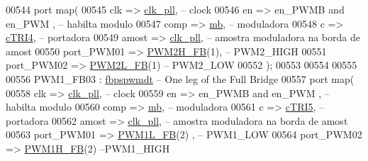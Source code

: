 \begin{DoxyCode}
00544     \textcolor{keywordflow}{port} \textcolor{keywordflow}{map}( 
00545          clk => \hyperlink{class_d_e0___n_a_n_o___v_f_1_1_m_a_i_n_a1d63ebfc050c1099e1dff991817ec3b0}{clk\_pll},\textcolor{keyword}{ -- clock}
00546          en => en\_PWMB \textcolor{keywordflow}{and} en\_PWM  ,\textcolor{keyword}{ -- habilta modulo}
00547          comp  => \hyperlink{class_d_e0___n_a_n_o___v_f_1_1_m_a_i_n_ad0814aaad64ee4aa4283f091e1cc4dfc}{mb},\textcolor{keyword}{ -- moduladora     }
00548          c => \hyperlink{class_d_e0___n_a_n_o___v_f_1_1_m_a_i_n_a569a3e9bfb8853bdf2c985d444cb4863}{cTRI4},\textcolor{keyword}{ -- portadora}
00549          amost => \hyperlink{class_d_e0___n_a_n_o___v_f_1_1_m_a_i_n_a1d63ebfc050c1099e1dff991817ec3b0}{clk\_pll},\textcolor{keyword}{ -- amostra moduladora na borda de amost}
00550          port\_PWM01  => \hyperlink{class_d_e0___n_a_n_o___v_f_a7efac822a270a6c828ef5eb2cc090127}{PWM2H\_FB}\textcolor{vhdlchar}{(}\textcolor{vhdllogic}{1}\textcolor{vhdlchar}{)},\textcolor{keyword}{ -- PWM2\_HIGH}
00551          port\_PWM02 => \hyperlink{class_d_e0___n_a_n_o___v_f_aefa13a97661cae3b7b87245ed460abe5}{PWM2L\_FB}\textcolor{vhdlchar}{(}\textcolor{vhdllogic}{1}\textcolor{vhdlchar}{)}\textcolor{keyword}{   -- PWM2\_LOW}
00552          \textcolor{vhdlchar}{)};                  
00553          
00554          
00555 
00556 PWM1\_FB03 : \hyperlink{classfbpspwmdt}{fbpspwmdt} -- One leg \textcolor{keywordflow}{of} the Full Bridge
00557     \textcolor{keywordflow}{port} \textcolor{keywordflow}{map}( 
00558          clk => \hyperlink{class_d_e0___n_a_n_o___v_f_1_1_m_a_i_n_a1d63ebfc050c1099e1dff991817ec3b0}{clk\_pll},\textcolor{keyword}{ -- clock}
00559          en => en\_PWMB \textcolor{keywordflow}{and} en\_PWM  ,\textcolor{keyword}{ -- habilta modulo}
00560          comp  => \hyperlink{class_d_e0___n_a_n_o___v_f_1_1_m_a_i_n_ad0814aaad64ee4aa4283f091e1cc4dfc}{mb},\textcolor{keyword}{ -- moduladora     }
00561          c => \hyperlink{class_d_e0___n_a_n_o___v_f_1_1_m_a_i_n_abc70ad694fb9be4565a31c4cde31d225}{cTRI5},\textcolor{keyword}{ -- portadora}
00562          amost => \hyperlink{class_d_e0___n_a_n_o___v_f_1_1_m_a_i_n_a1d63ebfc050c1099e1dff991817ec3b0}{clk\_pll},\textcolor{keyword}{ -- amostra moduladora na borda de amost}
00563          port\_PWM01  => \hyperlink{class_d_e0___n_a_n_o___v_f_ac5cc3b06408f1596a61b08b946a9c1d0}{PWM1L\_FB}\textcolor{vhdlchar}{(}\textcolor{vhdllogic}{2}\textcolor{vhdlchar}{)} ,\textcolor{keyword}{ -- PWM1\_LOW}
00564          port\_PWM02 => \hyperlink{class_d_e0___n_a_n_o___v_f_a69e944b362281970fb9a0a5ec6f5f068}{PWM1H\_FB}\textcolor{vhdlchar}{(}\textcolor{vhdllogic}{2}\textcolor{vhdlchar}{)}\textcolor{keyword}{   --PWM1\_HIGH}

\end{DoxyCode}
